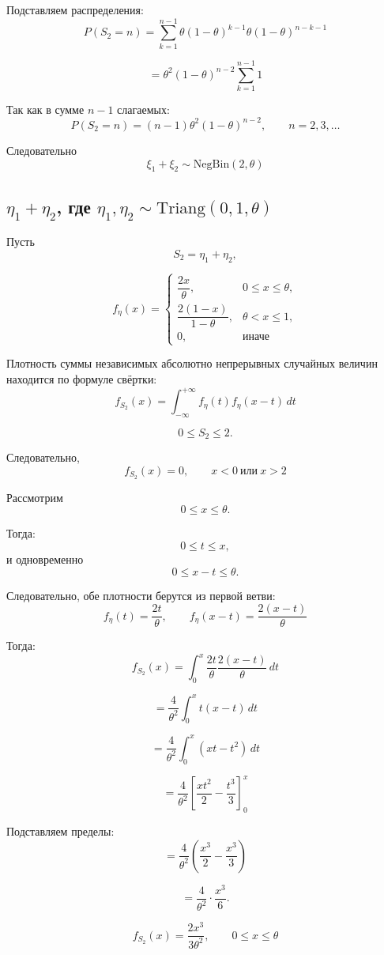 \documentclass[12pt,a4paper]{article}
\theoremstyle{definition}
\begin{document}
Подставляем распределения:
\[P(S_2=n)=
\sum_{k=1}^{n-1}
\theta(1-\theta)^{k-1}
\theta(1-\theta)^{n-k-1}\]

\[=\theta^2(1-\theta)^{n-2}\sum_{k=1}^{n-1}1\]

Так как в сумме $n-1$ слагаемых:
\[P(S_2=n)
=
(n-1)\theta^2(1-\theta)^{n-2},\qquad n=2,3,\dots\]

Следовательно
\[\boxed{\xi_1+\xi_2\sim \mathrm{NegBin}(2,\theta)}\]

\subsection{\texorpdfstring
{$\eta_1+\eta_2$, где $\eta_1,\eta_2\sim \mathrm{Triang}(0,1,\theta)$}
{eta1+eta2, где eta1, eta2 ~ Triang(0,1,theta)}}

Пусть
\[S_2=\eta_1+\eta_2,\]

\[f_\eta(x)=
\begin{cases}
\dfrac{2x}{\theta}, & 0\le x\le\theta,\\[1ex]
\dfrac{2(1-x)}{1-\theta}, & \theta<x\le1,\\[1ex]
0, & \text{иначе}\end{cases}\]

Плотность суммы независимых абсолютно непрерывных случайных величин находится по формуле свёртки:
\[f_{S_2}(x)=\int_{-\infty}^{+\infty}
f_\eta(t)f_\eta(x-t)\,dt\]

\[0\le S_2\le2.\]

Следовательно,
\[f_{S_2}(x)=0,\qquad x<0 \ \text{или}\ x>2\]

Рассмотрим 
\[0\le x\le\theta.\]

Тогда:
\[0\le t\le x,\]
и одновременно
\[0\le x-t\le\theta.\]

Следовательно, обе плотности берутся из первой ветви:
\[f_\eta(t)=\frac{2t}{\theta},\qquad f_\eta(x-t)=\frac{2(x-t)}{\theta}\]

Тогда:
\[f_{S_2}(x)=\int_0^x\frac{2t}{\theta}\frac{2(x-t)}{\theta}\,dt\]

\[=\frac4{\theta^2}\int_0^xt(x-t)\,dt\]

\[=\frac4{\theta^2}\int_0^x(xt-t^2)\,dt\]

\[=\frac4{\theta^2}
\left[\frac{xt^2}{2}-\frac{t^3}{3}\right]_0^x\]

Подставляем пределы:
\[=\frac4{\theta^2}\left(
\frac{x^3}{2}-\frac{x^3}{3}\right)\]

\[=\frac4{\theta^2}\cdot\frac{x^3}{6}.\]

\[\boxed{f_{S_2}(x)
=
\frac{2x^3}{3\theta^2},
\qquad 0\le x\le\theta}\]
\end{document}
